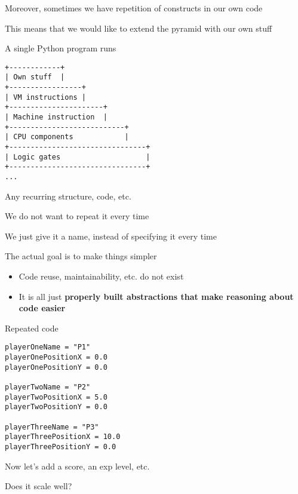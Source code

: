 \documentclass{beamer}
\begin{document}
\begin{slide}{
\item Moreover, sometimes we have repetition of constructs in our own code
\item This means that we would like to extend the pyramid with our own stuff
}\end{slide}

\begin{frame}[fragile]{A single Python program runs}
\begin{lstlisting}
+------------+
| Own stuff  |
+-----------------+
| VM instructions |
+----------------------+
| Machine instruction  |
+---------------------------+
| CPU components            |
+--------------------------------+
| Logic gates                    |
+--------------------------------+
...
\end{lstlisting}
\end{frame}

\begin{slide}{
\item Any recurring structure, code, etc.
\item We do not want to repeat it every time
\item We just give it a name, instead of specifying it every time
\item The actual goal is to make things simpler
\begin{itemize}
\item Code reuse, maintainability, etc. do not exist
\item It is all just \textbf{properly built abstractions that make reasoning about code easier}
\end{itemize}
}\end{slide}

\begin{frame}[fragile]{Repeated code}
\begin{lstlisting}
playerOneName = "P1"
playerOnePositionX = 0.0
playerOnePositionY = 0.0

playerTwoName = "P2"
playerTwoPositionX = 5.0
playerTwoPositionY = 0.0

playerThreeName = "P3"
playerThreePositionX = 10.0
playerThreePositionY = 0.0
\end{lstlisting}

\pause
Now let's add a score, an exp level, etc.

\pause
Does it scale well?
\end{frame}
\end{document}
